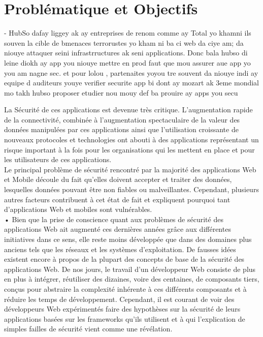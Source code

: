 \section{Problématique et Objectifs}

- HubSo dafay liggey ak ay entreprises de renom comme ay Total yo khamni ils souven la cible de bmenaces terrorustes yo kham ni ba ci web da ciye am; da niouye attaquer seini infrastrructures ak seni applications. Donc bala hubso di leine diokh ay app you niouye mettre en prod faut que mou assurer aue app yo you am nagne sec. et pour lolou , partenaites yoyou tre souvent da niouye indi ay equipe d auditeurs youye verifier securite app bi dont ay mozart ak 3eme mondial mo takh hubso proposer etudier nou mouy def ba prouire ay apps you secu

La Sécurité de ces applications est devenue très critique. L’augmentation rapide de la connectivité, combinée à l’augmentation spectaculaire de la valeur des données manipulées par ces applications ainsi que l’utilisation croissante de nouveaux protocoles et technologies ont abouti à des applications représentant un risque important à la fois pour les organisations qui les mettent en place et pour les utilisateurs de ces applications.\\
Le principal problème de sécurité rencontré par la majorité des applications Web et Mobile découle du fait qu’elles doivent accepter et traiter des données, lesquelles données pouvant être non fiables ou malveillantes. Cependant, plusieurs autres facteurs contribuent à cet état de fait et expliquent pourquoi tant d'applications Web et mobiles sont vulnérables.\\
• Bien que la prise de conscience quant aux problèmes de sécurité des applications Web ait augmenté ces dernières années grâce aux différentes initiatives dans ce sens, elle reste moins développée que dans des domaines plus anciens tels que les réseaux et les systèmes d'exploitation. De fausses idées existent encore à propos de la plupart des concepts de base de la sécurité des applications Web. De nos jours, le travail d’un développeur Web consiste de plus en plus à intégrer, réutiliser des dizaines, voire des centaines, de composants tiers, conçus pour abstraire la complexité inhérente à ces différents composants et à réduire les temps de développement. Cependant, il est courant de voir des développeurs Web expérimentés faire des hypothèses sur la sécurité de leurs applications basées sur les frameworks qu’ils utilisent et à qui l’explication de simples failles de sécurité vient comme une révélation.\\
